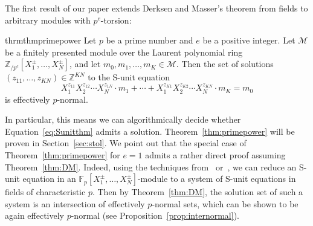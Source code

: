 \documentclass[letterpaper, 11pt, thm-restate]{article}
\numberwithin{equation}{section}
\newcommand{\Z}{\mathbb{Z}}
\newcommand{\N}{\mathbb{N}}
\newcommand{\Q}{\mathbb{Q}}
\newcommand{\F}{\mathbb{F}}
\newcommand{\Zpe}{\mathbb{Z}_{/p^e}}
\newcommand{\mM}{\mathcal{M}}
\newcommand{\ba}{\boldsymbol{a}}
\newcommand{\bh}{\boldsymbol{h}}
\theoremstyle{definition}
\theoremstyle{definition}
\theoremstyle{definition}
\newtheorem{rmk}[thrm]{Remark}
\begin{document}



The first result of our paper extends Derksen and Masser's theorem from fields to arbitrary modules with $p^e$-torsion:


\begin{restatable}{thrm}{thmprimepower}\label{thm:primepower}
    Let $p$ be a prime number and $e$ be a positive integer.
    Let $\mM$ be a finitely presented module over the Laurent polynomial ring $\Zpe[X_1^{\pm}, \ldots, X_N^{\pm}]$, and let $m_0, m_1, \ldots, m_K \in \mM$.
    Then the set of solutions $(z_{11}, \ldots, z_{KN}) \in \Z^{KN}$ to the S-unit equation
    \begin{equation}\label{eq:Sunitthm}
        X_1^{z_{11}} X_2^{z_{12}} \cdots X_N^{z_{1N}} \cdot m_1 + \cdots + X_1^{z_{K1}} X_2^{z_{K2}} \cdots X_N^{z_{KN}} \cdot m_K = m_0
    \end{equation}
    is effectively $p$-normal.
\end{restatable}


In particular, this means we can algorithmically decide whether Equation~\eqref{eq:Sunitthm} admits a solution.
Theorem~\ref{thm:primepower} will be proven in Section~\ref{sec:stol}.
We point out that the special case of Theorem~\ref{thm:primepower} for $e = 1$ admits a rather direct proof assuming Theorem~\ref{thm:DM}.
Indeed, using the techniques from~\cite[Section~9]{derksen2007skolem} or~\cite[Section~5]{dong2024submonoid}, we can reduce an S-unit equation in an $\F_p[X_1^{\pm}, \ldots, X_N^{\pm}]$-module to a system of S-unit equations in fields of characteristic $p$.
Then by Theorem~\ref{thm:DM}, the solution set of such a system is an intersection of effectively $p$-normal sets, which can be shown to be again effectively $p$-normal (see Proposition~\ref{prop:internormal}).
\end{document}
